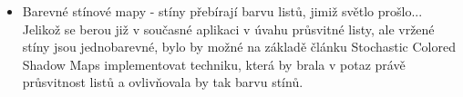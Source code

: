 \begin{itemize}
\item Barevné stínové mapy - stíny přebírají barvu listů, jimiž světlo prošlo...
Jelikož se berou již v současné aplikaci v úvahu průsvitné listy, ale vržené stíny jsou jednobarevné, bylo by možné na základě článku Stochastic Colored Shadow Maps implementovat techniku, která by brala v potaz právě průsvitnost listů a ovlivňovala by tak barvu stínů. 




\end{itemize}